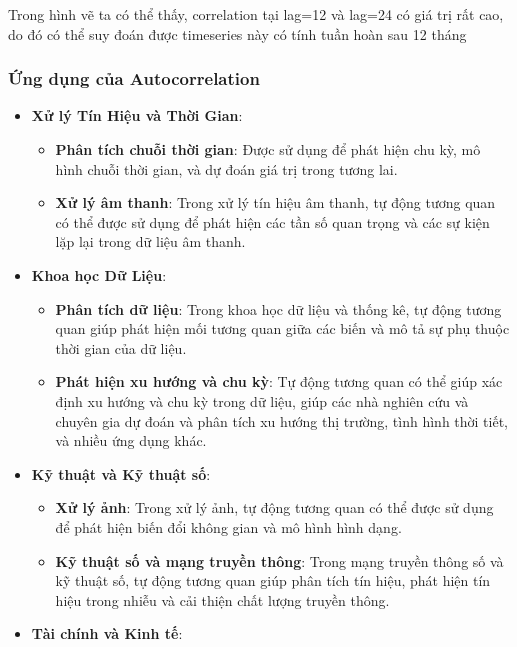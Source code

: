 \documentclass[
]{book}
\providecommand{\tightlist}{%
  \setlength{\itemsep}{0pt}\setlength{\parskip}{0pt}}
\begin{document}
Trong hình vẽ ta có thể thấy, correlation tại lag=12 và lag=24 có giá trị rất cao, do đó có thể suy đoán được timeseries này có tính tuần hoàn sau 12 tháng

\subsubsection{Ứng dụng của Autocorrelation}\label{ux1ee9ng-dux1ee5ng-cux1ee7a-autocorrelation}

\begin{itemize}
\tightlist
\item
  \textbf{Xử lý Tín Hiệu và Thời Gian}:

  \begin{itemize}
  \tightlist
  \item
    \textbf{Phân tích chuỗi thời gian}: Được sử dụng để phát hiện chu kỳ, mô hình chuỗi thời gian, và dự đoán giá trị trong tương lai.
  \item
    \textbf{Xử lý âm thanh}: Trong xử lý tín hiệu âm thanh, tự động tương quan có thể được sử dụng để phát hiện các tần số quan trọng và các sự kiện lặp lại trong dữ liệu âm thanh.
  \end{itemize}
\item
  \textbf{Khoa học Dữ Liệu}:

  \begin{itemize}
  \tightlist
  \item
    \textbf{Phân tích dữ liệu}: Trong khoa học dữ liệu và thống kê, tự động tương quan giúp phát hiện mối tương quan giữa các biến và mô tả sự phụ thuộc thời gian của dữ liệu.
  \item
    \textbf{Phát hiện xu hướng và chu kỳ}: Tự động tương quan có thể giúp xác định xu hướng và chu kỳ trong dữ liệu, giúp các nhà nghiên cứu và chuyên gia dự đoán và phân tích xu hướng thị trường, tình hình thời tiết, và nhiều ứng dụng khác.
  \end{itemize}
\item
  \textbf{Kỹ thuật và Kỹ thuật số}:

  \begin{itemize}
  \tightlist
  \item
    \textbf{Xử lý ảnh}: Trong xử lý ảnh, tự động tương quan có thể được sử dụng để phát hiện biến đổi không gian và mô hình hình dạng.
  \item
    \textbf{Kỹ thuật số và mạng truyền thông}: Trong mạng truyền thông số và kỹ thuật số, tự động tương quan giúp phân tích tín hiệu, phát hiện tín hiệu trong nhiễu và cải thiện chất lượng truyền thông.
  \end{itemize}
\item
  \textbf{Tài chính và Kinh tế}:


\end{itemize}
\end{document}
